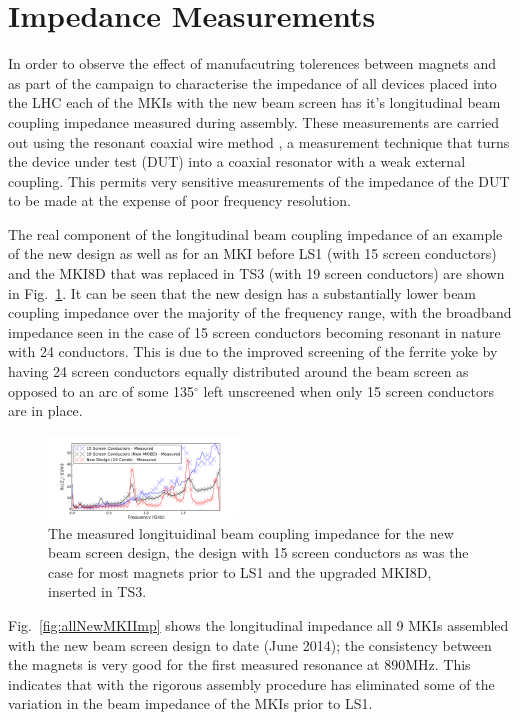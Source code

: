 \documentclass[a4paper,
              ]{jacow}
\begin{document}
\section{Impedance Measurements}

In order to observe the effect of manufacutring tolerences between magnets and as part of the campaign to characterise the impedance of all devices placed into the LHC each of the MKIs with the new beam screen has it's longitudinal beam coupling impedance measured during assembly. These measurements are carried out using the resonant coaxial wire method \cite{DayThesis}, a measurement technique that turns the device under test (DUT) into a coaxial resonator with a weak external coupling. This permits very sensitive measurements of the impedance of the DUT to be made at the expense of poor frequency resolution.

The real component of the longitudinal beam coupling impedance of an example of the new design as well as for an MKI before LS1 (with 15 screen conductors) and the MKI8D that was replaced in TS3 (with 19 screen conductors) are shown in Fig.~\ref{fig:Imp241915}. It can be seen that the new design has a substantially lower beam coupling impedance over the majority of the frequency range, with the broadband impedance seen in the case of 15 screen conductors becoming resonant in nature with 24 conductors. This is due to the improved screening of the ferrite yoke by having 24 screen conductors equally distributed around the beam screen as opposed to an arc of some 135$^{\circ}$ left unscreened when only 15 screen conductors are in place.

\begin{figure}
\includegraphics[width=0.45\textwidth]{measImp151924.pdf}
\caption{The measured longituidinal beam coupling impedance for the new beam screen design, the design with 15 screen conductors as was the case for most magnets prior to LS1 and the upgraded MKI8D, inserted in TS3.}
\label{fig:Imp241915}
\end{figure}

Fig.~\ref{fig:allNewMKIImp} shows the longitudinal impedance all 9 MKIs assembled with the new beam screen design to date (June 2014); the consistency between the magnets is very good for the first measured resonance at 890MHz. This indicates that with the rigorous assembly procedure has eliminated some of the variation in the beam impedance of the MKIs prior to LS1.
\end{document}
